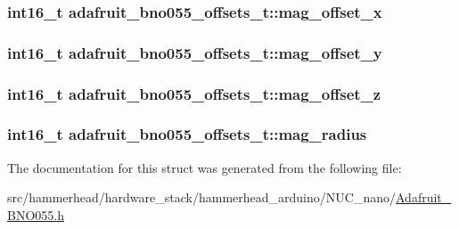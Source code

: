 \subsubsection[{\texorpdfstring{mag\+\_\+offset\+\_\+x}{mag_offset_x}}]{\setlength{\rightskip}{0pt plus 5cm}int16\+\_\+t adafruit\+\_\+bno055\+\_\+offsets\+\_\+t\+::mag\+\_\+offset\+\_\+x}\hypertarget{structadafruit__bno055__offsets__t_a0f424e0edf4c5dbfd876a936d5707548}{}\label{structadafruit__bno055__offsets__t_a0f424e0edf4c5dbfd876a936d5707548}
\subsubsection[{\texorpdfstring{mag\+\_\+offset\+\_\+y}{mag_offset_y}}]{\setlength{\rightskip}{0pt plus 5cm}int16\+\_\+t adafruit\+\_\+bno055\+\_\+offsets\+\_\+t\+::mag\+\_\+offset\+\_\+y}\hypertarget{structadafruit__bno055__offsets__t_ad5fb6f2cb2b5fc0f213a451f45c08786}{}\label{structadafruit__bno055__offsets__t_ad5fb6f2cb2b5fc0f213a451f45c08786}
\subsubsection[{\texorpdfstring{mag\+\_\+offset\+\_\+z}{mag_offset_z}}]{\setlength{\rightskip}{0pt plus 5cm}int16\+\_\+t adafruit\+\_\+bno055\+\_\+offsets\+\_\+t\+::mag\+\_\+offset\+\_\+z}\hypertarget{structadafruit__bno055__offsets__t_ae459af922307a2d61c7775f50f2c9dcc}{}\label{structadafruit__bno055__offsets__t_ae459af922307a2d61c7775f50f2c9dcc}
\subsubsection[{\texorpdfstring{mag\+\_\+radius}{mag_radius}}]{\setlength{\rightskip}{0pt plus 5cm}int16\+\_\+t adafruit\+\_\+bno055\+\_\+offsets\+\_\+t\+::mag\+\_\+radius}\hypertarget{structadafruit__bno055__offsets__t_ad0a4020e407ba70f2802f04c5fd840b6}{}\label{structadafruit__bno055__offsets__t_ad0a4020e407ba70f2802f04c5fd840b6}


The documentation for this struct was generated from the following file\+:\begin{DoxyCompactItemize}
\item 
src/hammerhead/hardware\+\_\+stack/hammerhead\+\_\+arduino/\+N\+U\+C\+\_\+nano/\hyperlink{Adafruit__BNO055_8h}{Adafruit\+\_\+\+B\+N\+O055.\+h}\end{DoxyCompactItemize}
